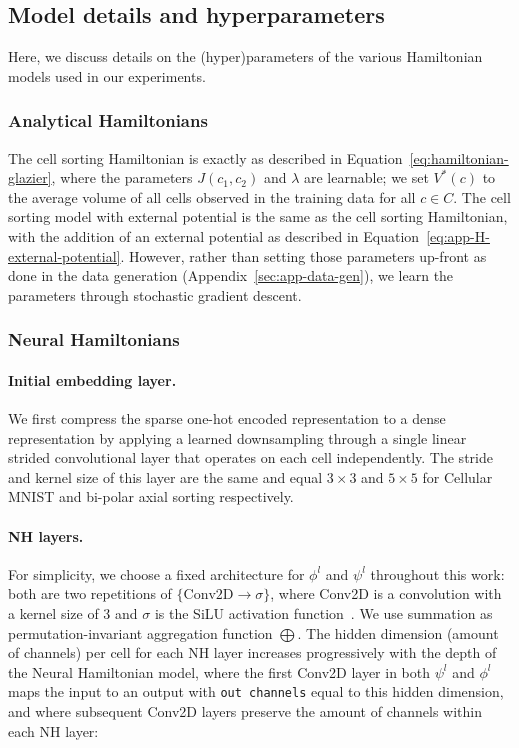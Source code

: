 \subsection{Model details and hyperparameters}\label{sec:app-all-model-details}
Here, we discuss details on the (hyper)parameters of the various Hamiltonian models used in our experiments.

\subsubsection{Analytical Hamiltonians}\label{sec:app-details-analytic-ham}
The cell sorting Hamiltonian is exactly as described in Equation~\ref{eq:hamiltonian-glazier}, where the parameters $J(c_1, c_2)$ and $\lambda$ are learnable; we set $V^*(c)$ to the average volume of all cells observed in the training data for all $c \in C$. The cell sorting model with external potential is the same as the cell sorting Hamiltonian, with the addition of an external potential as described in Equation~\ref{eq:app-H-external-potential}. However, rather than setting those parameters up-front as done in the data generation (Appendix~\ref{sec:app-data-gen}), we learn the parameters through stochastic gradient descent.


\subsubsection{Neural Hamiltonians}

\paragraph{Initial embedding layer.}
We first compress the sparse one-hot encoded representation to a dense representation by applying a learned downsampling through a single linear strided convolutional layer that operates on each cell independently. The stride and kernel size of this layer are the same and equal $3 \times 3$ and $5 \times 5$ for Cellular MNIST and bi-polar axial sorting respectively.

\paragraph{NH layers.}\label{sec:app-NH-design-details} For simplicity, we choose a fixed architecture for $\phi^l$ and $\psi^l$ throughout this work: both are two repetitions of $\{\text{Conv2D} \rightarrow \sigma\}$, where Conv2D is a convolution with a kernel size of 3 and $\sigma$ is the SiLU activation function~\cite{Elfwing2018silu}. We use summation as  permutation-invariant aggregation function $\bigoplus$. The hidden dimension (amount of channels) per cell for each NH layer increases progressively with the depth of the Neural Hamiltonian model, where the first Conv2D layer in both $\psi^l$ and $\phi^l$ maps the input to an output with \texttt{out channels} equal to this hidden dimension, and where subsequent Conv2D layers preserve the amount of channels within each NH layer:

